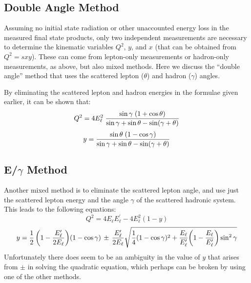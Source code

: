 \documentclass[12pt]{article}
\begin{document}
\subsection{Double Angle Method}

Assuming no initial state radiation or other unaccounted energy
loss in the measured final state products, only two independent
measurements are necessary to determine the kinematic variables $Q^2$,
$y$, and $x$ (that can be obtained from $Q^2 = s x y$). These can come
from lepton-only measurements or hadron-only measurements, as above,
but also mixed methods. Here we discuss the ``double angle'' method
that uses the scattered lepton ($\theta$)  and hadron ($\gamma$)
angles. 

By eliminating the scattered lepton and hadron energies in the
formulae given earlier, it can be shown that:
%
\begin{equation}
  Q^2 = 4 E_\ell^2\; {\sin\gamma\; (1+\cos\theta) \over
    \sin\gamma + \sin\theta -\sin (\gamma + \theta)}
\label{eq:DAQ2}
\end{equation}
%
\begin{equation}
  y = {\sin\theta\; (1-\cos\gamma) \over
    \sin\gamma + \sin\theta -\sin (\gamma + \theta)}
\label{eq:DAY}
\end{equation}
%

\subsection{E/$\gamma$ Method}

Another mixed method is to eliminate the scattered lepton angle, and
use just the scattered lepton energy and the angle $\gamma$ of the
scattered hadronic system. This leads to the following equations:
%
\begin{equation}
  Q^2 = 4 E_\ell E_\ell^\prime - 4 E_\ell^2 (1 - y)
  \label{eq:EGQ2}
\end{equation}
%
\begin{equation}
  y = {1\over 2}\,\bigg( 1 - {E_\ell^\prime \over 2 E_\ell} \bigg)
  (1-\cos\gamma)\, \pm \,{E_\ell^\prime \over 2 E_\ell} 
  \sqrt{{1\over 4}(1-\cos\gamma)^2 + {E_\ell \over E_\ell^\prime}
    \bigg(1-{E_\ell \over E_\ell^\prime}\bigg) \sin^2\gamma} 
  \label{eq:EGY}
\end{equation}
%
Unfortunately there does seem to be an ambiguity in the value of $y$
that arises from $\pm$ in solving the quadratic equation,
which perhaps can be broken by using one of the other methods.
\end{document}
